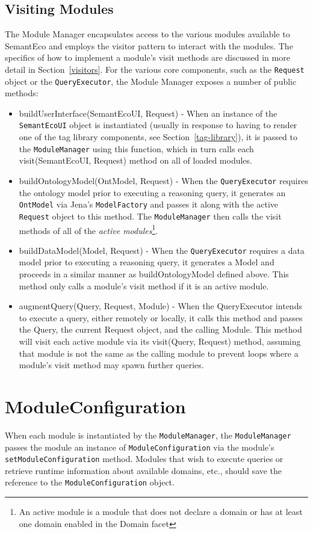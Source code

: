 \documentclass[letterpaper]{report}
\begin{document}
\subsection{Visiting Modules}
The Module Manager encapsulates access to the various modules available to SemantEco and employs the visitor pattern to interact with the modules. The specifics of how to implement a module's visit methods are discussed in more detail in Section~\ref{visitors}. For the various core components, such as the \texttt{Request} object or the \texttt{QueryExecutor}, the Module Manager exposes a number of public methods:

\begin{itemize}
\item buildUserInterface(SemantEcoUI, Request) - When an instance of the \texttt{SemantEcoUI} object is instantiated (usually in response to having to render one of the tag library components, see Section~\ref{tag-library}), it is passed to the \texttt{ModuleManager} using this function, which in turn calls each visit(SemantEcoUI, Request) method on all of loaded modules.
\item buildOntologyModel(OntModel, Request) - When the \texttt{QueryExecutor} requires the ontology model prior to executing a reasoning query, it generates an \texttt{OntModel} via Jena's \texttt{ModelFactory} and passes it along with the active \texttt{Request} object to this method. The \texttt{ModuleManager} then calls the visit methods of all of the \textit{active modules}\footnote{An active module is a module that does not declare a domain or has at least one domain enabled in the Domain facet}.
\item buildDataModel(Model, Request) - When the \texttt{QueryExecutor} requires a data model prior to executing a reasoning query, it generates a Model and proceeds in a similar manner as buildOntologyModel defined above. This method only calls a module's visit method if it is an active module.
\item augmentQuery(Query, Request, Module) - When the QueryExecutor intends to execute a query, either remotely or locally, it calls this method and passes the Query, the current Request object, and the calling Module. This method will visit each active module via its visit(Query, Request) method, assuming that module is not the same as the calling module to prevent loops where a module's visit method may spawn further queries.
\end{itemize}

\section{ModuleConfiguration}
When each module is instantiated by the \texttt{ModuleManager}, the \texttt{ModuleManager} passes the module an instance of \texttt{ModuleConfiguration} via the module's \texttt{setModuleConfiguration} method. Modules that wish to execute queries or retrieve runtime information about available domains, etc., should save the reference to the \texttt{ModuleConfiguration} object.
\end{document}
